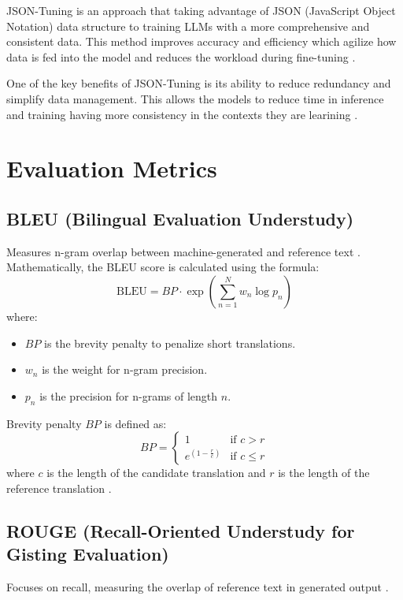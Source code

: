 JSON-Tuning is an approach that taking advantage of JSON (JavaScript Object Notation) data structure to training LLMs with a more comprehensive and consistent data. This method improves accuracy and efficiency which agilize how data is fed into the model and reduces the workload during fine-tuning \citep{zheng2024llamafactory}.

One of the key benefits of JSON-Tuning is its ability to reduce redundancy and simplify data management. This allows the models to reduce time in inference and training having more consistency in the contexts they are learining \citep{gao2024jsontuning}. 

\section{Evaluation Metrics} \label{sec:evaluation-metrics}
\subsection{BLEU (Bilingual Evaluation Understudy)}

Measures n-gram overlap between machine-generated and reference text \citep{Reiter2018A}. Mathematically, the BLEU score is calculated using the formula:
\[
\text{BLEU} = BP \cdot \exp \left( \sum_{n=1}^{N} w_n \log p_n \right)
\]
where:
\begin{itemize}
    \item \( BP \) is the brevity penalty to penalize short translations.
    \item \( w_n \) is the weight for n-gram precision.
    \item \( p_n \) is the precision for n-grams of length \( n \).
\end{itemize}

Brevity penalty \( BP \) is defined as:
\[
BP = 
\begin{cases} 
1 & \text{if } c > r \\
e^{(1-\frac{r}{c})} & \text{if } c \leq r 
\end{cases}
\]
where \( c \) is the length of the candidate translation and \( r \) is the length of the reference translation \citep{Reiter2018A}.

\subsection{ROUGE (Recall-Oriented Understudy for Gisting Evaluation)} 

Focuses on recall, measuring the overlap of reference text in generated output \citep{Ng2015Better}.

